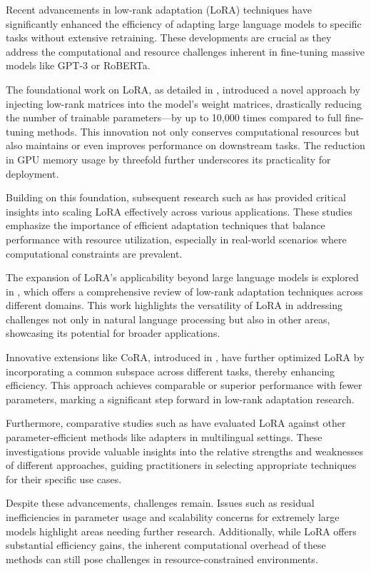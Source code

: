 \documentclass[conference]{IEEEtran}
\begin{document}
Recent advancements in low-rank adaptation (LoRA) techniques have significantly enhanced the efficiency of adapting large language models to specific tasks without extensive retraining. These developments are crucial as they address the computational and resource challenges inherent in fine-tuning massive models like GPT-3 or RoBERTa.

The foundational work on LoRA, as detailed in \cite{b1}, introduced a novel approach by injecting low-rank matrices into the model's weight matrices, drastically reducing the number of trainable parameters—by up to 10,000 times compared to full fine-tuning methods. This innovation not only conserves computational resources but also maintains or even improves performance on downstream tasks. The reduction in GPU memory usage by threefold further underscores its practicality for deployment.

Building on this foundation, subsequent research such as \cite{b2} has provided critical insights into scaling LoRA effectively across various applications. These studies emphasize the importance of efficient adaptation techniques that balance performance with resource utilization, especially in real-world scenarios where computational constraints are prevalent.

The expansion of LoRA's applicability beyond large language models is explored in \cite{b3}, which offers a comprehensive review of low-rank adaptation techniques across different domains. This work highlights the versatility of LoRA in addressing challenges not only in natural language processing but also in other areas, showcasing its potential for broader applications.

Innovative extensions like CoRA, introduced in \cite{b4}, have further optimized LoRA by incorporating a common subspace across different tasks, thereby enhancing efficiency. This approach achieves comparable or superior performance with fewer parameters, marking a significant step forward in low-rank adaptation research.

Furthermore, comparative studies such as \cite{b5} have evaluated LoRA against other parameter-efficient methods like adapters in multilingual settings. These investigations provide valuable insights into the relative strengths and weaknesses of different approaches, guiding practitioners in selecting appropriate techniques for their specific use cases.

Despite these advancements, challenges remain. Issues such as residual inefficiencies in parameter usage and scalability concerns for extremely large models highlight areas needing further research. Additionally, while LoRA offers substantial efficiency gains, the inherent computational overhead of these methods can still pose challenges in resource-constrained environments.
\end{document}
